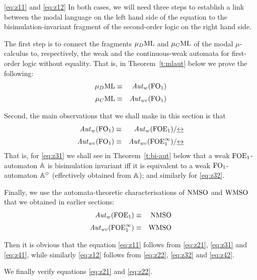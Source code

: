 \begin{proofof}{\eqref{eq:z11} and \eqref{eq:z12}}
In both cases, we will need three steps to establish a link between the modal 
language on the left hand side of the equation to the bisimulation-invariant 
fragment of the second-order logic on the right hand side.

The first step is to connect the fragments $\mu_{D}\mathrm{ML}$ and $\mu_{C}\mathrm{ML}$ of the modal 
$\mu$-calculus to, respectively, the weak and the continuous-weak automata for
first-order logic without equality.
That is, in Theorem~\ref{t:mlaut} below we prove the following:
\begin{eqnarray}
   \AFMC &\equiv& \AutW(\ofo)
   \label{eq:z21}
\\[1mm] \mucML &\equiv&  \AutWC(\ofo)
   \label{eq:z22}
\end{eqnarray}

Second, the main observations that we shall make in this section is that 
\begin{eqnarray}
\AutW(\ofo)  &\equiv& \AutW(\ofoe)/{\bis} 
   \label{eq:z31}
\\[1mm] 
\AutWC(\ofo) &\equiv&  \AutWC(\ofoei)/ {\bis} 
   \label{eq:z32}
\end{eqnarray}
That is, for \eqref{eq:z31} we shall see in Theorem~\ref{t:bi-aut} below that a
weak $\mathrm{FOE}_1$-automaton $\mathbb{A}$ is bisimulation invariant iff it is equivalent to
a weak $\mathrm{FO}_1$-automaton $\mathbb{A}^{\Diamond}$ (effectively obtained from $\mathbb{A}$);
and similarly for \eqref{eq:z32}.

Finally, we use the automata-theoretic characterisations of $\mathrm{NMSO}$ and $\mathrm{WMSO}$
that we obtained in earlier sections:
\begin{eqnarray}
\AutW(\ofoe)   &\equiv&  \nmso
   \label{eq:z41}
\\[1mm] 
\AutWC(\ofoei) &\equiv&  \wmso 
   \label{eq:z42}
\end{eqnarray}

Then it is obvious that the equation \eqref{eq:z11} follows from \eqref{eq:z21},
\eqref{eq:z31} and \eqref{eq:z41}, while similarly 
\eqref{eq:z12} follows from \eqref{eq:z22}, \eqref{eq:z32} and \eqref{eq:z42}.
\end{proofof}

We finally verify equations \eqref{eq:z21} and \eqref{eq:z22}.

